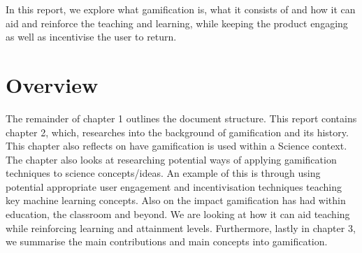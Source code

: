 		In this report, we explore what gamification is, what it consists of and how it can aid and reinforce the teaching and learning, while keeping the product engaging as well as incentivise the user to return.
		
	\section{Overview}  
		\label{sec:intro_overview} 
		
		The remainder of chapter 1 outlines the document structure. This report contains chapter 2, which, researches into the background of gamification and its history. This chapter also reflects on have gamification is used within a Science context. The chapter also looks at researching potential ways of applying gamification techniques to science concepts/ideas. An example of this is through using potential appropriate user engagement and incentivisation techniques teaching key machine learning concepts. Also on the impact gamification has had within education, the classroom and beyond. We are looking at how it can aid teaching while reinforcing learning and attainment levels. Furthermore, lastly in chapter 3, we summarise the main contributions and main concepts into gamification.
	
		
		
		
			
			 
			
			
			
						
			
			
			
